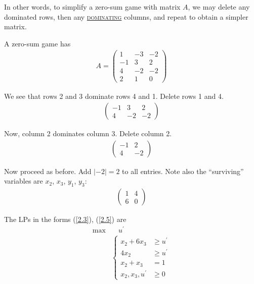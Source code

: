 In other words, to simplify a zero-sum game with matrix $A$, we may delete any dominated rows, then any \uline{\textcolor{MarkerColour}{\textsc{dominating}}} columns, and repeat to obtain a simpler matrix.

\begin{example}
    A zero-sum game has
    \begin{align}
        A = \left(\begin{array}{ccc}
            1 & -3 & -2   \\
            -1 & 3 & 2 \\
            4 & -2 & -2 \\
            2 & 1 & 0
        \end{array} \right)\label{2.10}
    \end{align}

    We see that rows 2 and 3 dominate rows 4 and 1. Delete rows 1 and 4.
    \begin{align*}
        \left(\begin{array}{ccc}
            -1 & 3 & 2 \\
            4 & -2 & -2
        \end{array} \right)
    \end{align*}

    Now, column 2 dominates column 3. Delete column 2.
    \begin{align*}
        \left(\begin{array}{cc}
            -1 & 2 \\
            4 & -2 
        \end{array} \right)
    \end{align*}

    Now proceed as before. Add $|-2| = 2$ to all entries. Note also the ``surviving'' variables are $x_2$, $x_3$, $y_1$, $y_3$:
    \begin{align*}
        \left(\begin{array}{cc}
            1 & 4  \\
            6 & 0 
        \end{array} \right)
    \end{align*}

    The LPs in the forms (\ref{2.3}), (\ref{2.5}) are
    \begin{align*}
        \max & \quad u^{\prime} \\
        & \left\lbrace\begin{array}{rl}
            x_2 + 6x_3 &\geqslant u^{\prime} \\
            4x_2 & \geqslant u^{\prime}\\
            x_2 + x_3 &= 1 \\
            x_2, x_3, u^{\prime} & \geqslant 0
        \end{array} \right.
    \end{align*}


\end{example}

